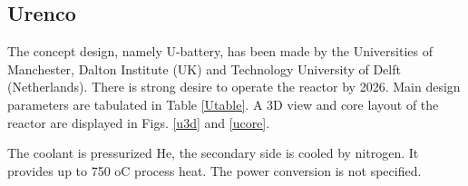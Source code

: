 \pagebreak
\subsection{Urenco}
The concept design, namely U-battery, has been made by the Universities of Manchester, Dalton Institute (UK) and Technology University of Delft (Netherlands). There is strong desire to operate the reactor by 2026. Main design parameters \cite{ding_design_2011} are tabulated in Table \ref{Utable}. A 3D view and core layout of the reactor are displayed in Figs. \ref{u3d} and \ref{ucore}. 

The coolant is pressurized He, the secondary side is cooled by nitrogen. It provides up to 750 oC process heat. The power conversion is not specified.

\begin{table} [htbp]
\begin{center}


\end{center}
\end{table}
